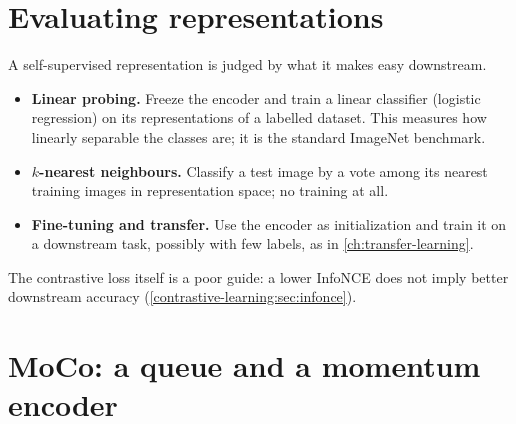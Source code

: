 \begin{notechapter}
\section{Evaluating representations}\label{contrastive-practice:sec:evaluation}

A self-supervised representation is judged by what it makes easy downstream.
\begin{itemize}
  \item \textbf{Linear probing.} Freeze the encoder and train a linear classifier (logistic
        regression) on its representations of a labelled dataset. This measures how linearly
        separable the classes are; it is the standard ImageNet benchmark.
  \item \textbf{$k$-nearest neighbours.} Classify a test image by a vote among its nearest training
        images in representation space; no training at all.
  \item \textbf{Fine-tuning and transfer.} Use the encoder as initialization and train it on a
        downstream task, possibly with few labels, as in \cref{ch:transfer-learning}.
\end{itemize}
The contrastive loss itself is a poor guide: a lower InfoNCE does not imply better downstream
accuracy (\cref{contrastive-learning:sec:infonce}).

\section{MoCo: a queue and a momentum encoder}\label{contrastive-practice:sec:moco}


\end{notechapter}
